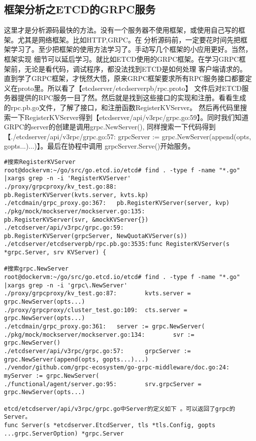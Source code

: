 \subsection{框架分析之ETCD的GRPC服务}
这里才是分析源码最快的方法。没有一个服务器不使用框架，或使用自己写的框架。尤其是网络框架。比如HTTP,GRPC。在
分析源码前，一定要花时间先把框架学习了。至少把框架的使用方法学习了。手动写几个框架的小应用更好。当然，框架实现
细节可以延后学习。就比如ETCD使用的GRPC框架。在学习GRPC框架前，无论是看代码，调试程序，都没法找到ETCD是如何处理
客户端请求的。直到学了GRPC框架，才恍然大悟，原来GRPC框架要求所有RPC服务接口都要定义在proto里。所以看了【etcdserver/etcdserverpb/rpc.proto】
文件后对ETCD服务器提供的RPC服务一目了然。然后就是找到这些接口的实现和注册。看看生成的rpc.pb.go文件，了解了接口，和注册函数RegisterKVServer。
然后再代码里搜索一下RegisterKVServer得到【etcdserver/api/v3rpc/grpc.go:59】。同时我们知道GRPC的server的创建是调用grpc.NewServer(),
同样搜索一下代码得到【./etcdserver/api/v3rpc/grpc.go:57:      grpcServer := grpc.NewServer(append(opts, gopts...)...)】。最后在协程中调用
grpcServer.Serve()开始服务。
\begin{verbatim}
#搜索RegisterKVServer
root@dockervm:~/go/src/go.etcd.io/etcd# find . -type f -name "*.go" |xargs grep -n -i 'RegisterKVServer'
./proxy/grpcproxy/kv_test.go:88:        pb.RegisterKVServer(kvts.server, kvts.kp)
./etcdmain/grpc_proxy.go:367:   pb.RegisterKVServer(server, kvp)
./pkg/mock/mockserver/mockserver.go:135:        pb.RegisterKVServer(svr, &mockKVServer{})
./etcdserver/api/v3rpc/grpc.go:59:      pb.RegisterKVServer(grpcServer, NewQuotaKVServer(s))
./etcdserver/etcdserverpb/rpc.pb.go:3535:func RegisterKVServer(s *grpc.Server, srv KVServer) {

#搜索grpc.NewServer
root@dockervm:~/go/src/go.etcd.io/etcd# find . -type f -name "*.go" |xargs grep -n -i 'grpc\.NewServer'
./proxy/grpcproxy/kv_test.go:87:        kvts.server = grpc.NewServer(opts...)
./proxy/grpcproxy/cluster_test.go:109:  cts.server = grpc.NewServer(opts...)
./etcdmain/grpc_proxy.go:361:   server := grpc.NewServer(
./pkg/mock/mockserver/mockserver.go:134:        svr := grpc.NewServer()
./etcdserver/api/v3rpc/grpc.go:57:      grpcServer := grpc.NewServer(append(opts, gopts...)...)
./vendor/github.com/grpc-ecosystem/go-grpc-middleware/doc.go:24:        myServer := grpc.NewServer(
./functional/agent/server.go:95:        srv.grpcServer = grpc.NewServer(opts...)

etcd/etcdserver/api/v3rpc/grpc.go中Server的定义如下 。可以返回了grpc的Server。
func Server(s *etcdserver.EtcdServer, tls *tls.Config, gopts ...grpc.ServerOption) *grpc.Server 
\end{verbatim}